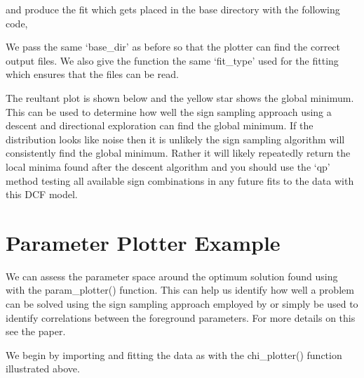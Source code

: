 \documentclass[letterpaper,10pt,english]{sphinxmanual}
\let\sphinxpxdimen\pdfpxdimen\else\newdimen\sphinxpxdimen
\begin{document}
and produce the fit which gets placed in the base directory with the following
code,

\begin{sphinxVerbatim}[commandchars=\\\{\}]
  
\end{sphinxVerbatim}

We pass the same ‘base\_dir’ as before so that the plotter can find the correct output
files. We also give the function the same ‘fit\_type’ used for the fitting which
ensures that the files can be read.

The reultant plot is shown below and the yellow star shows the global minimum.
This can be used to determine how well
the sign sampling approach using a descent and directional exploration
can find the global minimum. If the distribution looks like noise then it is
unlikely the sign sampling algorithm will consistently find the global minimum.
Rather it will likely repeatedly return the local minima found after the descent
algorithm and you should use the ‘qp’ method testing all available sign combinations
in any future fits to the data with this DCF model.

\noindent{\hspace*{\fill}\sphinxincludegraphics[width=400\sphinxpxdimen]{{chi_distribution}.png}\hspace*{\fill}}


\section{Parameter Plotter Example}
\label{\detokenize{source/maxsmooth:parameter-plotter-example}}
We can assess the parameter space around the optimum solution
found using  with the param\_plotter() function.
This can help us identify how well a problem can be solved using the
sign sampling approach employed by  or simply
be used to identify correlations between the foreground parameters.
For more details on this see the  paper.

We begin by importing and fitting the data as with the chi\_plotter()
function illustrated above.
\end{document}
